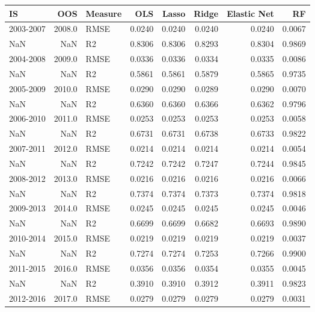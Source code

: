 \begin{tabular}{lrlrrrrr}
\toprule
        IS &     OOS & Measure &     OLS &   Lasso &   Ridge &  Elastic Net &      RF \\
\midrule
 2003-2007 &  2008.0 &    RMSE &  0.0240 &  0.0240 &  0.0240 &       0.0240 &  0.0067 \\
       NaN &     NaN &      R2 &  0.8306 &  0.8306 &  0.8293 &       0.8304 &  0.9869 \\
 2004-2008 &  2009.0 &    RMSE &  0.0336 &  0.0336 &  0.0334 &       0.0335 &  0.0086 \\
       NaN &     NaN &      R2 &  0.5861 &  0.5861 &  0.5879 &       0.5865 &  0.9735 \\
 2005-2009 &  2010.0 &    RMSE &  0.0290 &  0.0290 &  0.0289 &       0.0290 &  0.0070 \\
       NaN &     NaN &      R2 &  0.6360 &  0.6360 &  0.6366 &       0.6362 &  0.9796 \\
 2006-2010 &  2011.0 &    RMSE &  0.0253 &  0.0253 &  0.0253 &       0.0253 &  0.0058 \\
       NaN &     NaN &      R2 &  0.6731 &  0.6731 &  0.6738 &       0.6733 &  0.9822 \\
 2007-2011 &  2012.0 &    RMSE &  0.0214 &  0.0214 &  0.0214 &       0.0214 &  0.0054 \\
       NaN &     NaN &      R2 &  0.7242 &  0.7242 &  0.7247 &       0.7244 &  0.9845 \\
 2008-2012 &  2013.0 &    RMSE &  0.0216 &  0.0216 &  0.0216 &       0.0216 &  0.0066 \\
       NaN &     NaN &      R2 &  0.7374 &  0.7374 &  0.7373 &       0.7374 &  0.9818 \\
 2009-2013 &  2014.0 &    RMSE &  0.0245 &  0.0245 &  0.0245 &       0.0245 &  0.0046 \\
       NaN &     NaN &      R2 &  0.6699 &  0.6699 &  0.6682 &       0.6693 &  0.9890 \\
 2010-2014 &  2015.0 &    RMSE &  0.0219 &  0.0219 &  0.0219 &       0.0219 &  0.0037 \\
       NaN &     NaN &      R2 &  0.7274 &  0.7274 &  0.7253 &       0.7266 &  0.9900 \\
 2011-2015 &  2016.0 &    RMSE &  0.0356 &  0.0356 &  0.0354 &       0.0355 &  0.0045 \\
       NaN &     NaN &      R2 &  0.3910 &  0.3910 &  0.3912 &       0.3911 &  0.9823 \\
 2012-2016 &  2017.0 &    RMSE &  0.0279 &  0.0279 &  0.0279 &       0.0279 &  0.0031 \\

\end{tabular}
